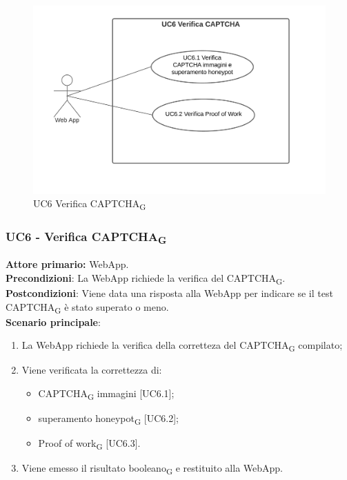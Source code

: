 \begin{figure}[H]
    \centering
    \includegraphics[scale=0.6]{img/verifica.png}
    \caption{UC6 Verifica CAPTCHA\textsubscript{G}}
\end{figure}

\subsubsection{UC6 - Verifica CAPTCHA\textsubscript{G}}
\textbf{Attore primario:} WebApp.\\
\textbf{Precondizioni}: La WebApp richiede la verifica 
 del CAPTCHA\textsubscript{G}.\\
\textbf{Postcondizioni}: Viene data una risposta alla WebApp per indicare se il test CAPTCHA\textsubscript{G} è stato superato o meno.\\

\textbf{Scenario principale}:
\begin{enumerate}
    \item La WebApp richiede la verifica della corretteza del CAPTCHA\textsubscript{G} compilato;
    \item Viene verificata la correttezza di:
    \begin{itemize}
		\item CAPTCHA\textsubscript{G} immagini [UC6.1];
        \item superamento honeypot\textsubscript{G} [UC6.2];
		\item Proof of work\textsubscript{G} [UC6.3].
    \end{itemize}
    \item Viene emesso il risultato booleano\textsubscript{G} e restituito alla WebApp.
\end{enumerate}

